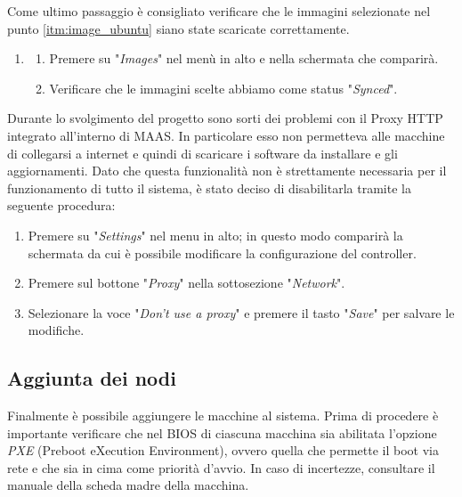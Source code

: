 \bigskip
Come ultimo passaggio è consigliato verificare che le immagini selezionate nel punto \ref{itm:image_ubuntu} 
siano state scaricate correttamente.
\begin{enumerate}
    \item[] 
    \begin{enumerate}
        \item Premere su "\emph{Images}" nel menù in alto e nella schermata che comparirà.
        
        \item Verificare che le immagini scelte abbiamo come status "\emph{Synced}".
    \end{enumerate}
\end{enumerate}

\noindent
Durante lo svolgimento del progetto sono sorti dei problemi con il Proxy HTTP integrato all'interno di MAAS.
% 
In particolare esso non permetteva alle macchine di collegarsi a internet e quindi di scaricare i software da installare e gli aggiornamenti.
% 
Dato che questa funzionalità non è strettamente necessaria per il funzionamento di tutto il sistema, è stato deciso di disabilitarla tramite la seguente procedura:
\begin{enumerate}
    \item Premere su "\textit{Settings}" nel menu in alto; in questo modo comparirà la schermata da cui è possibile modificare la configurazione del controller.
    
    \item Premere sul bottone "\textit{Proxy}" nella sottosezione "\textit{Network}".
    
    \item Selezionare la voce "\textit{Don't use a proxy}" e premere il tasto "\textit{Save}" per salvare le modifiche.
\end{enumerate}


\subsection{Aggiunta dei nodi}\label{subsubsec:maas_add_node}
Finalmente è possibile aggiungere le macchine al sistema.
% 
% 
Prima di procedere è importante verificare che nel BIOS di ciascuna macchina sia abilitata l'opzione \emph{PXE} (Preboot eXecution Environment), ovvero quella che permette il boot via rete e che sia 
in cima come priorità d'avvio.
% 
In caso di incertezze, consultare il manuale della scheda madre della macchina.

